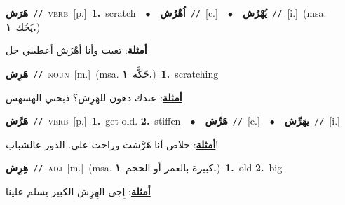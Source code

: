 \documentclass[10pt,a4paper,twoside]{article} %
\begin{document}
\begin{multicols}{2}
{\setlength\topsep{0pt}\textbf{\foreignlanguage{arabic}{هَرَش}}\ {\color{gray}\texttt{//}\color{black}}\ \textsc{verb}\ [p.]\ \textbf{1.}~scratch\ \ $\bullet$\ \ \setlength\topsep{0pt}\textbf{\foreignlanguage{arabic}{اُهْرُش}}\ {\color{gray}\texttt{//}\color{black}}\ [c.]\ \ $\bullet$\ \ \setlength\topsep{0pt}\textbf{\foreignlanguage{arabic}{يُهْرُش}}\ {\color{gray}\texttt{//}\color{black}}\ [i.]\ \color{gray}(msa. \foreignlanguage{arabic}{يَحُك}~\foreignlanguage{arabic}{\textbf{١.}})\color{black}\  \begin{flushright}\color{gray}\foreignlanguage{arabic}{\textbf{\underline{\foreignlanguage{arabic}{أمثلة}}}: تعبت وأنا أهْرُش أعطيني حل}\end{flushright}\color{black}} \vspace{2mm}

{\setlength\topsep{0pt}\textbf{\foreignlanguage{arabic}{هَرِش}}\ {\color{gray}\texttt{//}\color{black}}\ \textsc{noun}\ [m.]\ \color{gray}(msa. \foreignlanguage{arabic}{حًكَّة}~\foreignlanguage{arabic}{\textbf{١.}})\color{black}\ \textbf{1.}~scratching\  \begin{flushright}\color{gray}\foreignlanguage{arabic}{\textbf{\underline{\foreignlanguage{arabic}{أمثلة}}}: عندك دهون للهَرِش؟ ذبحني الهسهس}\end{flushright}\color{black}} \vspace{2mm}

{\setlength\topsep{0pt}\textbf{\foreignlanguage{arabic}{هَرَّش}}\ {\color{gray}\texttt{//}\color{black}}\ \textsc{verb}\ [p.]\ \textbf{1.}~get old.  \textbf{2.}~stiffen\ \ $\bullet$\ \ \setlength\topsep{0pt}\textbf{\foreignlanguage{arabic}{هَرِّش}}\ {\color{gray}\texttt{//}\color{black}}\ [c.]\ \ $\bullet$\ \ \setlength\topsep{0pt}\textbf{\foreignlanguage{arabic}{يهَرِّش}}\ {\color{gray}\texttt{//}\color{black}}\ [i.]\  \begin{flushright}\color{gray}\foreignlanguage{arabic}{\textbf{\underline{\foreignlanguage{arabic}{أمثلة}}}: خلاص أنا هَرَّشت وراحت علي. الدور عالشباب!}\end{flushright}\color{black}} \vspace{2mm}

{\setlength\topsep{0pt}\textbf{\foreignlanguage{arabic}{هِرِش}}\ {\color{gray}\texttt{//}\color{black}}\ \textsc{adj}\ [m.]\ \color{gray}(msa. \foreignlanguage{arabic}{كبيرة بالعمر أو الحجم}~\foreignlanguage{arabic}{\textbf{١.}})\color{black}\ \textbf{1.}~old  \textbf{2.}~big\  \begin{flushright}\color{gray}\foreignlanguage{arabic}{\textbf{\underline{\foreignlanguage{arabic}{أمثلة}}}: إِجى الهِرِش الكبير يسلم علينا}\end{flushright}\color{black}} \vspace{2mm}


\end{multicols}
\end{document}
